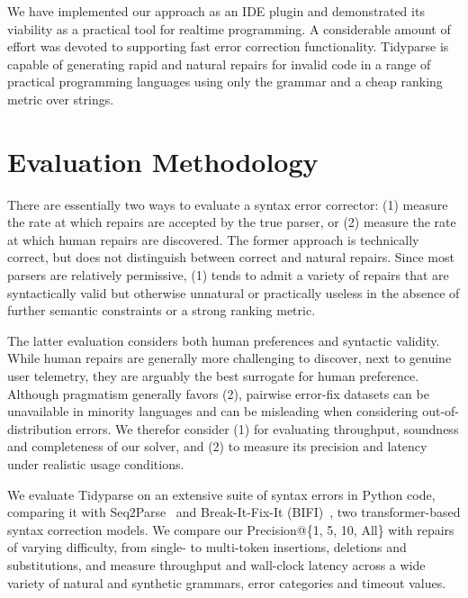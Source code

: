 \documentclass[sigplan,screen]{acmart}
\begin{document}
We have implemented our approach as an IDE plugin and demonstrated its viability as a practical tool for realtime programming. A considerable amount of effort was devoted to supporting fast error correction functionality. Tidyparse is capable of generating rapid and natural repairs for invalid code in a range of practical programming languages using only the grammar and a cheap ranking metric over strings.


\section{Evaluation Methodology}


There are essentially two ways to evaluate a syntax error corrector: (1) measure the rate at which repairs are accepted by the true parser, or (2) measure the rate at which human repairs are discovered. The former approach is technically correct, but does not distinguish between correct and natural repairs. Since most parsers are relatively permissive, (1) tends to admit a variety of repairs that are syntactically valid but otherwise unnatural or practically useless in the absence of further semantic constraints or a strong ranking metric.

The latter evaluation considers both human preferences and syntactic validity. While human repairs are generally more challenging to discover, next to genuine user telemetry, they are arguably the best surrogate for human preference. Although pragmatism generally favors (2), pairwise error-fix datasets can be unavailable in minority languages and can be misleading when considering out-of-distribution errors. We therefor consider (1) for evaluating throughput, soundness and completeness of our solver, and (2) to measure its precision and latency under realistic usage conditions.

We evaluate Tidyparse on an extensive suite of syntax errors in Python code, comparing it with Seq2Parse~\cite{sakkas2022seq2parse} and Break-It-Fix-It (BIFI)~\cite{yasunaga2021break}, two transformer-based syntax correction models. We compare our Precision@\{1, 5, 10, All\} with repairs of varying difficulty, from single- to multi-token insertions, deletions and substitutions, and measure throughput and wall-clock latency across a wide variety of natural and synthetic grammars, error categories and timeout values.
\end{document}
